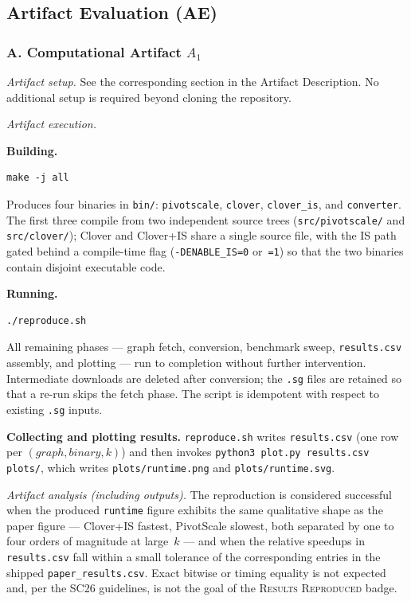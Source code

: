 \subsection*{Artifact Evaluation (AE)}

\subsubsection*{A. Computational Artifact $A_1$}

\noindent\emph{Artifact setup.}
See the corresponding section in the Artifact Description. No additional
setup is required beyond cloning the repository.

\noindent\emph{Artifact execution.}

\noindent\textbf{Building.}
\begin{verbatim}
make -j all
\end{verbatim}
Produces four binaries in \texttt{bin/}: \texttt{pivotscale},
\texttt{clover}, \texttt{clover\_is}, and \texttt{converter}. The first
three compile from two independent source trees
(\texttt{src/pivotscale/} and \texttt{src/clover/}); \textsf{Clover} and
\textsf{Clover+IS} share a single source file, with the IS path gated
behind a compile-time flag (\texttt{-DENABLE\_IS=0} or~\texttt{=1}) so
that the two binaries contain disjoint executable code.

\noindent\textbf{Running.}
\begin{verbatim}
./reproduce.sh
\end{verbatim}
All remaining phases --- graph fetch, conversion, benchmark sweep,
\texttt{results.csv} assembly, and plotting --- run to completion
without further intervention. Intermediate downloads are deleted after
conversion; the \texttt{.sg} files are retained so that a re-run skips
the fetch phase. The script is idempotent with respect to existing
\texttt{.sg} inputs.

\noindent\textbf{Collecting and plotting results.}
\texttt{reproduce.sh} writes \texttt{results.csv} (one row per
\((graph, binary, k)\)) and then invokes \texttt{python3 plot.py
results.csv plots/}, which writes \texttt{plots/runtime.png} and
\texttt{plots/runtime.svg}.

\noindent\emph{Artifact analysis (including outputs).}
The reproduction is considered successful when the produced
\texttt{runtime} figure exhibits the same qualitative shape as the paper
figure --- \textsf{Clover+IS} fastest, \textsf{PivotScale} slowest, both
separated by one to four orders of magnitude at large~$k$ --- and when
the relative speedups in \texttt{results.csv} fall within a small
tolerance of the corresponding entries in the shipped
\texttt{paper\_results.csv}. Exact bitwise or timing equality is not
expected and, per the SC26 guidelines, is not the goal of the
\textsc{Results Reproduced} badge.

